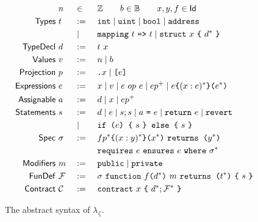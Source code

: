 \newcommand{\AddrCall}[3]{
  {#1}\Keywd{\{}{#2}\Keywd{\}(}{#3}\Keywd{)}
}
\newcommand{\Call}[2]{
  {#1}\Keywd{(}{#2}\Keywd{)}
}
\newcommand{\SpecCall}[4]{
  {#1}\Keywd{\{}{#2}\Keywd{\}(}{#3}\Keywd{)} ~\Keywd{returns (}{#4}\Keywd{)}
}
\newcommand{\SpecCond}[3]{
  \Keywd{requires}~ {#1} ~\Keywd{ensures}~ {#2} ~\Keywd{where}~ {#3}
}
\newcommand{\FunDef}[6]{
  {#1} ~\Keywd{function}~ {#2}\Keywd{(}{#3}\Keywd{)} ~ {#4} ~\Keywd{returns (}{#5}\Keywd{)} ~\Keywd{\{}~ {#6} ~\Keywd{\}}
}
\newcommand{\FunType}[4]{
  \Keywd{function}~ {#1}\Keywd{(}{#2}\Keywd{)} ~ {#3} ~\Keywd{returns (}{#4}\Keywd{)}
}
\newcommand{\Contract}[3]{
  \Keywd{contract}~ {#1}~ \Keywd{\{}~ {#2}; {#3} ~\Keywd{\}}
}

\newcommand{\F}{\mathcal{F}}
\newcommand{\C}{\mathcal{C}}

\begin{figure}
  \begin{alignat*}{3}
    &~ n && \in && \mathbb{Z} \qquad b \in \mathbb{B} \qquad x,y,f \in \Typ{Id}   \\
    \Typ{Types} &~ t && :=\ && \Keywd{int} \mid \Keywd{uint} \mid \Keywd{bool} \mid \Keywd{address} \\
                &~   && \mid\ && \Keywd{mapping} ~t~ \Keywd{=>} ~t \mid \Keywd{struct} ~x~ \Keywd{\{}~ d^* ~\Keywd{\}} \\
    \Typ{TypeDecl}    &~ d && :=\ && t ~ x \\
    \Typ{Values}      &~ v && :=\ && n \mid b \\
    \Typ{Projection}  &~ p && :=\ && \Keywd{.}x \mid \Keywd{[}e\Keywd{]} \\
    \Typ{Expressions} &~ e && :=\ && x \mid v \mid e ~op~ e \mid e p^+ \mid \AddrCall{e}{(x: e)^*}{e^*} \\
    \Typ{Assignable}  &~ a && :=\ && d \mid x \mid e p^+ \\
    \Typ{Statements}  &~ s && :=\ && d \mid e \mid s; s \mid a ~\Keywd{=}~ e \mid \Keywd{return}~ e \mid \Keywd{revert} \\
                      &~   && \mid\ && \Keywd{if (}e\Keywd{) \{}~ s ~\Keywd{\} else \{}~ s ~\Keywd{\}} \\
    \Typ{Spec}        &~ \sigma && :=\ && \SpecCall{fp^*}{(x : y)^*}{x^*}{y^*} \\
                      &~        &&     && \SpecCond{e}{e}{\sigma^*} \\
    \Typ{Modifiers}   &~ m && :=\ && \Keywd{public} \mid \Keywd{private} \\
    \Typ{FunDef}      &~ \F&& :=\ && \FunDef{\sigma}{f}{d^*}{m}{t^*}{s} \\
    \Typ{Contract}    &~ \C&& :=\ && \Contract{x}{d^*}{\F^*}
  \end{alignat*}
  \caption{The abstract syntax of $\lambda_\lang$. }
  \label{fig:syntax}
\end{figure}

